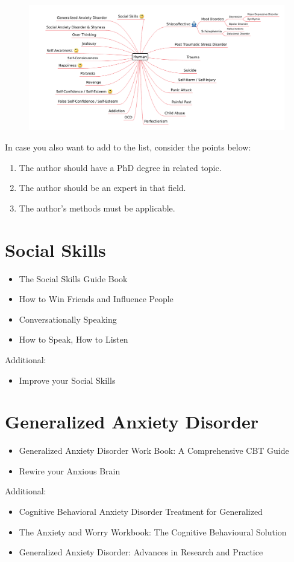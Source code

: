 \documentclass[12pt, a4paper]{article}
\newenvironment{additional}{%
    \begin{list}{}%
        {\setlength{\leftmargin}{\parindent}}%
        \item[]%
        Additional:
        \begin{itemize}}
    {\end{itemize}\end{list}}
\begin{document}
\begin{figure}[hb]\centering
    \includegraphics[width=\textwidth]{human.png}
\end{figure}

In case you also want to add to the list, consider the points below:
\begin{enumerate}
    \item The author should have a PhD degree in related topic.
    \item The author should be an expert in that field.
    \item The author's methods must be applicable.
\end{enumerate}

\newpage

\section{Social Skills}
\begin{itemize}
    \item The Social Skills Guide Book
    \item How to Win Friends and Influence People
    \item Conversationally Speaking
    \item How to Speak, How to Listen
\end{itemize}
\begin{additional}
    \item Improve your Social Skills
\end{additional}

\section{Generalized Anxiety Disorder}
\begin{itemize}
    \item Generalized Anxiety Disorder Work Book: A Comprehensive CBT Guide
    \item Rewire your Anxious Brain
\end{itemize}
\begin{additional}
    \item Cognitive Behavioral Anxiety Disorder Treatment for Generalized
    \item The Anxiety and Worry Workbook: The Cognitive Behavioural Solution
    \item Generalized Anxiety Disorder: Advances in Research and Practice
\end{additional}
\end{document}
